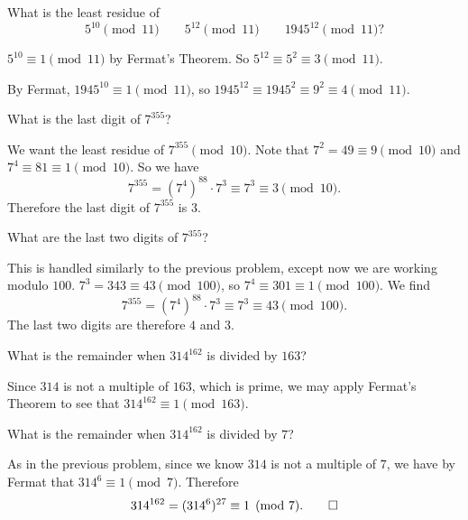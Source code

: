  What is the least residue of
\begin{equation*}
  5^{10}\pmod{11} \qquad 5^{12}\pmod{11} \qquad 1945^{12}\pmod{11}?
\end{equation*}
\begin{solution}
  $5^{10}\equiv1\pmod{11}$ by Fermat's Theorem. So
  $5^{12} \equiv 5^2 \equiv 3\pmod{11}$.

  By Fermat, $1945^{10}\equiv1\pmod{11}$, so
  $1945^{12}\equiv1945^2\equiv9^2\equiv4\pmod{11}$.
\end{solution}

 What is the last digit of $7^{355}$?
\begin{solution}
  We want the least residue of $7^{355} \pmod{10}$. Note that
  $7^2 = 49 \equiv 9\pmod{10}$ and $7^4\equiv81\equiv1\pmod{10}$. So
  we have
  \begin{equation*}
    7^{355} = (7^4)^{88}\cdot7^3 \equiv 7^3 \equiv 3 \pmod {10}.
  \end{equation*}
  Therefore the last digit of $7^{355}$ is $3$.
\end{solution}

 What are the last two digits of $7^{355}$?
\begin{solution}
  This is handled similarly to the previous problem, except now we are
  working modulo $100$. $7^3 = 343 \equiv 43\pmod{100}$, so
  $7^4\equiv301\equiv1\pmod{100}$. We find
  \begin{equation*}
    7^{355} = (7^4)^{88}\cdot7^3 \equiv 7^3 \equiv 43\pmod{100}.
  \end{equation*}
  The last two digits are therefore $4$ and $3$.
\end{solution}

 What is the remainder when $314^{162}$ is divided by $163$?
\begin{solution}
  Since $314$ is not a multiple of $163$, which is prime, we may apply
  Fermat's Theorem to see that $314^{162}\equiv1\pmod{163}$.
\end{solution}

 What is the remainder when $314^{162}$ is divided by $7$?
\begin{solution}
  As in the previous problem, since we know $314$ is not a multiple of
  $7$, we have by Fermat that $314^6\equiv1\pmod7$. Therefore
  \begin{equation*}
    314^{162} = (314^6)^{27} \equiv 1\pmod7. \qedhere
  \end{equation*}
\end{solution}

